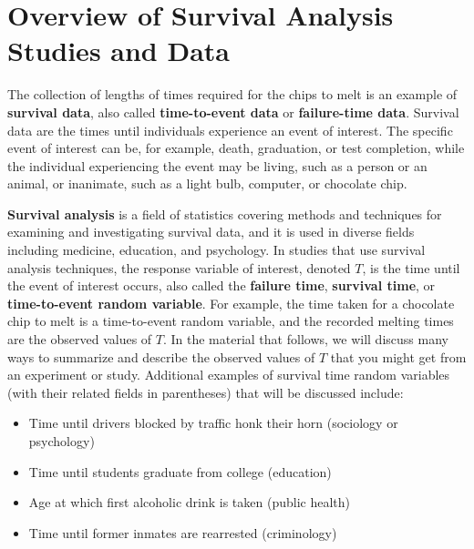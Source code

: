 \documentclass[
]{report}
\providecommand{\tightlist}{%
  \setlength{\itemsep}{0pt}\setlength{\parskip}{0pt}}
\begin{document}
\section{\texorpdfstring{\textbf{Overview of Survival Analysis Studies and Data}}{Overview of Survival Analysis Studies and Data}}\label{overview-of-survival-analysis-studies-and-data}

The collection of lengths of times required for the chips to melt is an example of \textbf{survival data}, also called \textbf{time-to-event data} or \textbf{failure-time data}. Survival data are the times until individuals experience an event of interest. The specific event of interest can be, for example, death, graduation, or test completion, while the individual experiencing the event may be living, such as a person or an animal, or inanimate, such as a light bulb, computer, or chocolate chip.

\textbf{Survival analysis} is a field of statistics covering methods and techniques for examining and investigating survival data, and it is used in diverse fields including medicine, education, and psychology. In studies that use survival analysis techniques, the response variable of interest, denoted \(T\), is the time until the event of interest occurs, also called the \textbf{failure time}, \textbf{survival time}, or \textbf{time-to-event random variable}. For example, the time taken for a chocolate chip to melt is a time-to-event random variable, and the recorded melting times are the observed values of \(T\). In the material that follows, we will discuss many ways to summarize and describe the observed values of \(T\) that you might get from an experiment or study. Additional examples of survival time random variables (with their related fields in parentheses) that will be discussed include:

\begin{itemize}
\tightlist
\item
  Time until drivers blocked by traffic honk their horn (sociology or psychology)\\
\item
  Time until students graduate from college (education)\\
\item
  Age at which first alcoholic drink is taken (public health)\\
\item
  Time until former inmates are rearrested (criminology)
\end{itemize}
\end{document}
